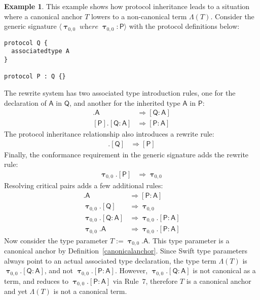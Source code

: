\documentclass[a4paper,headsepline,bibliography=totoc,toc=flat,fleqn,twoside=semi]{scrbook}
\theoremstyle{definition}
\theoremstyle{definition}
\newtheorem{example}{Example}[chapter]
\theoremstyle{definition}
\newcommand{\namesym}[1]{\mathsf{#1}}
\newcommand{\proto}[1]{\bm{\mathsf{#1}}}
\newcommand{\protosym}[1]{[\proto{#1}]}
\newcommand{\gensig}[2]{\langle #1\;\textit{where}\;#2\rangle}
\newcommand{\genericsym}[2]{\bm{\uptau}_{#1,#2}}
\newcommand{\assocsym}[2]{[\proto{#1}\colon\namesym{#2}]}
\begin{document}
\begin{example} This example shows how protocol inheritance leads to a situation where a canonical anchor $T$ lowers to a non-canonical term $\Lambda(T)$. Consider the generic signature $\gensig{\genericsym{0}{0}}{\genericsym{0}{0}\colon\proto{P}}$ with the protocol definitions below:
\begin{Verbatim}
protocol Q {
  associatedtype A
}

protocol P : Q {}
\end{Verbatim}
The rewrite system has two associated type introduction rules, one for the declaration of $\namesym{A}$ in $\proto{Q}$, and another for the inherited type $\namesym{A}$ in $\proto{P}$:
\begin{align}
\protosym{Q}.\namesym{A}&\Rightarrow\assocsym{Q}{A}\tag{1}\\
\protosym{P}.\assocsym{Q}{A}&\Rightarrow \assocsym{P}{A}\tag{2}
\end{align}
The protocol inheritance relationship also introduces a rewrite rule:
\begin{align}
\protosym{P}.\protosym{Q}&\Rightarrow\protosym{P}\tag{3}
\end{align}
Finally, the conformance requirement in the generic signature adds the rewrite rule:
\begin{align}
\genericsym{0}{0}.\protosym{P}&\Rightarrow\genericsym{0}{0}\tag{4}
\end{align}
Resolving critical pairs adds a few additional rules:
\begin{align}
\protosym{P}.\namesym{A}&\Rightarrow\assocsym{P}{A}\tag{5}\\
\genericsym{0}{0}.\protosym{Q}&\Rightarrow\genericsym{0}{0}\tag{6}\\
\genericsym{0}{0}.\assocsym{Q}{A}&\Rightarrow\genericsym{0}{0}.\assocsym{P}{A}\tag{7}\\
\genericsym{0}{0}.\namesym{A}&\Rightarrow\genericsym{0}{0}.\assocsym{P}{A}\tag{8}
\end{align}
Now consider the type parameter $T:=\genericsym{0}{0}.\namesym{A}$. This type parameter is a canonical anchor by Definition~\ref{canonicalanchor}. Since Swift type parameters always point to an actual associated type declaration, the type term $\Lambda(T)$ is $\genericsym{0}{0}.\assocsym{Q}{A}$, and not $\genericsym{0}{0}.\assocsym{P}{A}$. However, $\genericsym{0}{0}.\assocsym{Q}{A}$ is not canonical as a term, and reduces to $\genericsym{0}{0}.\assocsym{P}{A}$ via Rule~7, therefore $T$ is a canonical anchor and yet $\Lambda(T)$ is not a canonical term.


\end{example}
\end{document}
